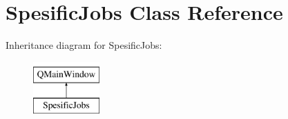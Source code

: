 \hypertarget{class_spesific_jobs}{}\section{Spesific\+Jobs Class Reference}
\label{class_spesific_jobs}
Inheritance diagram for Spesific\+Jobs\+:\begin{figure}[H]
\begin{center}
\leavevmode
\includegraphics[height=2.000000cm]{class_spesific_jobs}
\end{center}
\end{figure}
